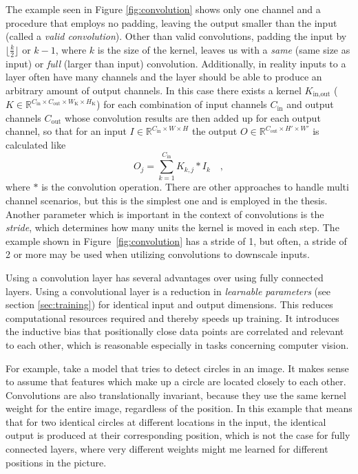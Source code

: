 The example seen in Figure \ref{fig:convolution} shows only one channel and a procedure that employs no padding, leaving the output smaller than the input (called a \emph{valid convolution}). Other than valid convolutions, padding the input by $\lfloor\frac{k}{2}\rfloor$ or $k - 1$, where $k$ is the size of the kernel, leaves us with a \emph{same} (same size as input) or \emph{full} (larger than input) convolution. Additionally, in reality inputs to a layer often have many channels and the layer should be able to produce an arbitrary amount of output channels. In this case there exists a kernel $K_{\text{in}, \text{out}}$ ($K\in \mathbb{R}^{C_\text{in}\times C_\text{out}\times W_\text{K} \times H_\text{K}}$) for each combination of input channels $C_\text{in}$ and output channels $C_{\text{out}}$ whose convolution results are then added up for each output channel, so that for an input $I\in \mathbb{R}^{C_\text{in}\times W \times H}$ the output $O\in \mathbb{R}^{C_\text{out}\times H' \times W'}$ is calculated like
$$
    O_j = \sum_{k=1}^{C_\text{in}} K_{k,j} * I_k\quad,
$$
where $*$ is the convolution operation. There are other approaches to handle multi channel scenarios, but this is the simplest one and is employed in the thesis.
Another parameter which is important in the context of convolutions is the \emph{stride}, which determines how many units the kernel is moved in each step. The example shown in Figure~\ref{fig:convolution} has a stride of 1, but often, a stride of 2 or more may be used when utilizing convolutions to downscale inputs.

Using a convolution layer has several advantages over using fully connected layers. Using a convolutional layer is a reduction in \emph{learnable parameters} (see section \ref{sec:training}) for identical input and output dimensions. This reduces computational resources required and thereby speeds up training. It introduces the inductive bias that positionally close data points are correlated and relevant to each other, which is reasonable especially in tasks concerning computer vision. 

For example, take a model that tries to detect circles in an image. It makes sense to assume that features which make up a circle are located closely to each other. Convolutions are also translationally invariant, because they use the same kernel weight for the entire image, regardless of the position. 
In this example that means that for two identical circles at different locations in the input, the identical output is produced at their corresponding position, which is not the case for fully connected layers, where very different weights might me learned for different positions in the picture.


